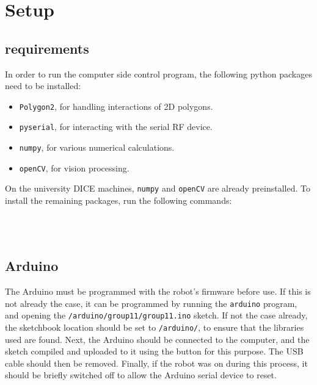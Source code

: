\section{Setup}
\subsection{requirements}

In order to run the computer side control program, the following python
packages need to be installed:

\begin{itemize}
\item \texttt{Polygon2}, for handling interactions of 2D polygons.
\item \texttt{pyserial}, for interacting with the serial RF device.
\item \texttt{numpy}, for various numerical calculations.
\item \texttt{openCV}, for vision processing.
\end{itemize}

On the university DICE machines, \texttt{numpy} and \texttt{openCV} are already
preinstalled. To install the remaining packages, run the following commands:

 \\
 \\

\subsection{Arduino}

The Arduino must be programmed with the robot's firmware before use. If this is
not already the case, it can be programmed by running the \texttt{arduino}
program, and opening the \texttt{/arduino/group11/group11.ino} sketch. If not
the case already, the sketchbook location should be set to \texttt{/arduino/},
to ensure that the libraries used are found. Next, the Arduino should be
connected to the computer, and the sketch compiled and uploaded to it using the
button for this purpose. The USB cable should then be removed. Finally, if the
robot was on during this process, it should be briefly switched off to allow
the Arduino serial device to reset.
